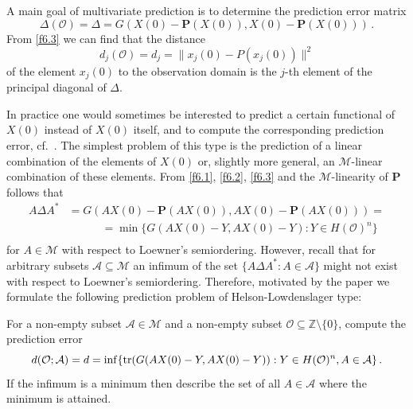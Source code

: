 \documentclass{amsart}
\begin{document}
A main goal of multivariate prediction is to determine the prediction error matrix
\begin{equation}  \label{f6.3}
    \Delta({\mathcal O}) = \Delta = G(X(0)-{\mathbf P}(X(0)), X(0)-{\mathbf P}(X(0))) \, .
\end{equation}    
From \eqref{f6.3} we can find that the distance
\begin{equation} \label{f6.4}
    d_j({\mathcal O}) = d_j = \| x_j(0)-P(x_j(0)) \|^2
\end{equation}
of the element $x_j(0)$ to the observation domain is the $j$-th element of the principal diagonal of $\Delta$. 

In practice one would sometimes be interested to predict a certain functional of $X(0)$ instead of $X(0)$ itself, and to compute the corresponding prediction error, cf.~\cite{MMS,V}. The simplest problem of this type is the prediction of a linear combination of the elements of $X(0)$ or, slightly more general, an $\mathcal M$-linear combination of these elements. From \eqref{f6.1}, \eqref{f6.2}, \eqref{f6.3} and the $\mathcal M$-linearity of $\mathbf P$ follows that 
\begin{equation}   \label{f6.5}
\begin{split}
    A \Delta A^*   & =  G(AX(0)-{\mathbf P}(A X(0)), AX(0)-{\mathbf P}(A X(0)) ) =\\
   & \quad \quad \quad =  \min \{ G(A X(0)-Y,A X(0)-Y) : Y \in H({\mathcal O})^n \}\\
\end{split}
\end{equation}
for $A \in \mathcal M$ with respect to Loewner's semiordering. However, recall that for arbitrary subsets ${\mathcal A} \subseteq \mathcal M$ an infimum of the set $\{ A \Delta A^* : A \in {\mathcal A} \}$ might not exist with respect to Loewner's semiordering. Therefore, motivated by the paper \cite{HL} we formulate the following prediction problem of Helson-Lowdenslager type:

\begin{problemHL}
{\rm
For a non-empty subset ${\mathcal A} \in {\mathcal M}$ and a non-empty subset ${\mathcal O} \subseteq {\mathbb Z} \setminus \{ 0 \}$, compute the prediction error
\[
    d({\mathcal O} ; {\mathcal A}) = d = \inf \{ {\rm tr} (G(AX(0)-Y,AX(0)-Y)) : Y \in H({\mathcal O})^n, A \in {\mathcal A} \} \, .
\]
If the infimum is a minimum then describe the set of all $A \in {\mathcal A}$ where the minimum is attained.
}
\end{problemHL}
\end{document}
